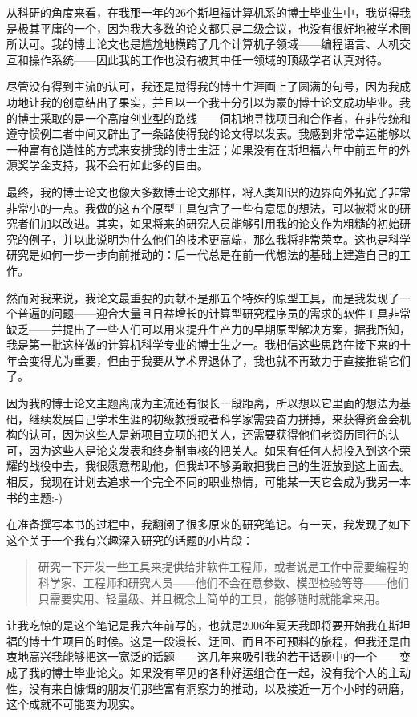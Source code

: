 \documentclass[letter,12pt]{book}
\begin{document}
\begin{CJK}{UTF8}{gbsn}
\breakline

从科研的角度来看，在我那一年的26个斯坦福计算机系的博士毕业生中，我觉得我是极其平庸的一个，因为我大多数的论文都只是二级会议，也没有很好地被学术圈所认可。我的博士论文也是尴尬地横跨了几个计算机子领域——编程语言、人机交互和操作系统——因此我的工作也没有被其中任一领域的顶级学者认真对待。

尽管没有得到主流的认可，我还是觉得我的博士生涯画上了圆满的句号，因为我成功地让我的创意结出了果实，并且以一个我十分引以为豪的博士论文成功毕业。我的博士采取的是一个高度创业型的路线——伺机地寻找项目和合作者，在非传统和遵守惯例二者中间又辟出了一条路使得我的论文得以发表。我感到非常幸运能够以一种富有创造性的方式来安排我的博士生涯；如果没有在斯坦福六年中前五年的外源奖学金支持，我不会有如此多的自由。

最终，我的博士论文也像大多数博士论文那样，将人类知识的边界向外拓宽了非常非常小的一点。我做的这五个原型工具包含了一些有意思的想法，可以被将来的研究者们加以改进。其实，如果将来的研究人员能够引用我的论文作为粗糙的初始研究的例子，并以此说明为什么他们的技术更高端，那么我将非常荣幸。这也是科学研究是如何一步一步向前推动的：后一代总是在前一代想法的基础上建造自己的工作。

然而对我来说，我论文最重要的贡献不是那五个特殊的原型工具，而是我发现了一个普遍的问题——迎合大量且日益增长的计算型研究程序员的需求的软件工具非常缺乏——并提出了一些人们可以用来提升生产力的早期原型解决方案，据我所知，我是第一批这样做的计算机科学专业的博士生之一。我相信这些思路在接下来的十年会变得尤为重要，但由于我要从学术界退休了，我也就不再致力于直接推销它们了。

因为我的博士论文主题离成为主流还有很长一段距离，所以想以它里面的想法为基础，继续发展自己学术生涯的初级教授或者科学家需要奋力拼搏，来获得资金会机构的认可，因为这些人是新项目立项的把关人，还需要获得他们老资历同行的认可，因为这些人是论文发表和终身制审核的把关人。如果有任何人想投入到这个荣耀的战役中去，我很愿意帮助他，但我却不够勇敢把我自己的生涯放到这上面去。相反，我现在计划去追求一个完全不同的职业热情，可能某一天它会成为我另一本书的主题:-)

\breakline

在准备撰写本书的过程中，我翻阅了很多原来的研究笔记。有一天，我发现了如下这个关于一个我有兴趣深入研究的话题的小片段：
\begin{quote}
  研究一下开发一些工具来提供给非软件工程师，或者说是工作中需要编程的科学家、工程师和研究人员——他们不会在意参数、模型检验等等——他们只需要实用、轻量级、并且概念上简单的工具，能够随时就能拿来用。
\end{quote}
让我吃惊的是这个笔记是我六年前写的，也就是2006年夏天我即将要开始我在斯坦福的博士生项目的时候。这是一段漫长、迂回、而且不可预料的旅程，但我还是由衷地高兴我能够把这一宽泛的话题——这几年来吸引我的若干话题中的一个——变成了我的博士毕业论文。如果没有罕见的各种好运组合在一起，没有我个人的主动性，没有来自慷慨的朋友们那些富有洞察力的推动，以及接近一万个小时的研磨，这个成就不可能变为现实。


\end{CJK}
\end{document}
